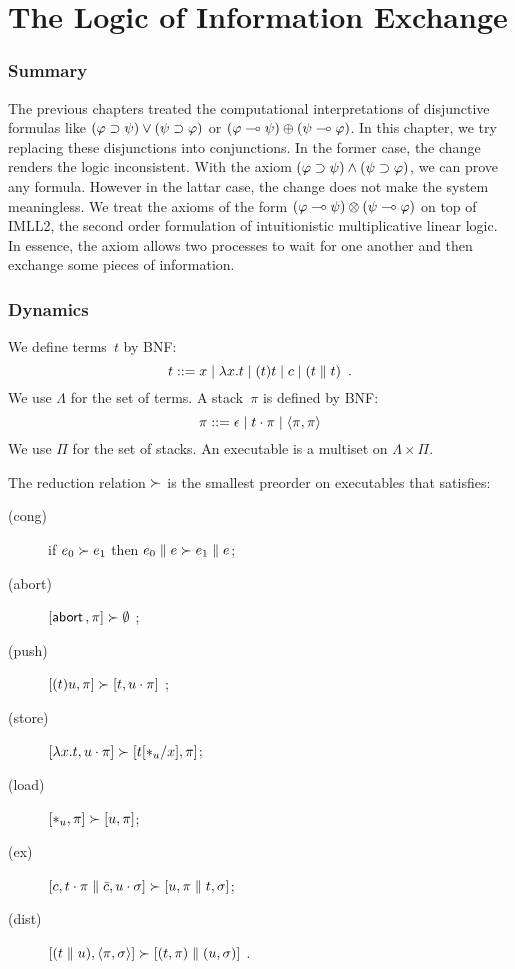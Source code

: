 \chapter{The Logic of Information Exchange}
\label{ch:exchange}

\subsection{Summary}

The previous chapters treated the computational interpretations of
disjunctive formulas like $(\varphi\supset\psi)\lor(\psi\supset\varphi)$ or
$(\varphi\multimap\psi)\oplus(\psi\multimap\varphi)$.  In this chapter, we try
replacing these disjunctions into conjunctions.
In the former case, the change renders the logic inconsistent.
With the axiom $(\varphi\supset\psi)\land(\psi\supset\varphi)$,
we can prove any formula.  However in the lattar case, the change does
not make the system meaningless.  We treat
the axioms of the form $(\varphi\multimap\psi)\otimes(\psi\multimap\varphi)$
on top of IMLL2, the second order formulation of intuitionistic
multiplicative linear
logic.  In essence, the axiom allows two processes to wait for one
another and then exchange some pieces of information.

\subsection{Dynamics}

We define terms~$t$ by BNF:
\[
 t ::= x\mid \lambda x.t\mid (t)t\mid c \mid (t\parallel t)\enspace.
\]
We use $\Lambda$ for the set of terms.
A stack~$\pi$ is defined by BNF:
\[
 \pi ::= \epsilon\mid t\cdot\pi \mid \langle{\pi,\pi}\rangle
\]
We use $\Pi$ for the set of stacks.
An executable is a multiset on $\Lambda\times \Pi$.

The reduction relation $\succ$ is the smallest preorder on executables
that satisfies:
\begin{description}
 \item[(cong)] if
      $e_0         \succ e_1$
      then
      $e_0 \parallel e \succ e_1\parallel e$\enspace;
 \item[(abort)] $[\mathsf{abort\,},\pi]\succ \emptyset$ \enspace;
 \item[(push)]
	    $[(t)u,\pi]      \succ [t,u\cdot\pi]$      \enspace;
 \item[(store)]
	    $[\lambda x.t,u\cdot\pi]
	     \succ
	     [t[\ast_u/x],      \pi]$\enspace;
 \item[(load)]
	    $[\ast_u,\pi]\succ [u,\pi]$\enspace;
 \item[(ex)]
           $[c, t\cdot\pi\parallel \bar{c},
           u\cdot\sigma] \succ
           [u,\pi\parallel t,\sigma]$\enspace;
 \item[(dist)]
           $[(t\parallel u),\langle{\pi,\sigma}\rangle]  \succ [(t,\pi)\parallel (u,\sigma)]$ \enspace.
\end{description}


